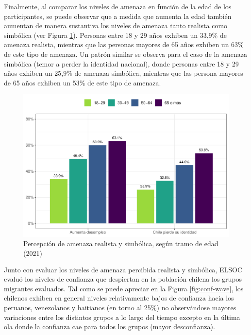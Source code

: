 \documentclass[
  12pt,
]{book}
\begin{document}
Finalmente, al comparar los niveles de amenaza en función de la edad de los participantes, se puede observar que a medida que aumenta la edad también aumentan de manera sustantiva los niveles de amenaza tanto realista como simbólica (ver Figura \ref{fig:amen-edad}). Personas entre 18 y 29 años exhiben un 33,9\% de amenaza realista, mientras que las personas mayores de 65 años exhiben un 63\% de este tipo de amenaza. Un patrón similar se observa para el caso de la amenaza simbólica (temor a perder la identidad nacional), donde personas entre 18 y 29 años exhiben un 25,9\% de amenaza simbólica, mientras que las persona mayores de 65 años exhiben un 53\% de este tipo de amenaza.

\begin{figure}

{\centering \includegraphics{reporte-elsoc_files/figure-latex/amen-edad-1} 

}

\caption{Percepción de amenaza realista y simbólica, según tramo de edad (2021)}\label{fig:amen-edad}
\end{figure}

Junto con evaluar los niveles de amenaza percibida realista y simbólica, ELSOC evaluó los niveles de confianza que despiertan en la población chilena los grupos migrantes evaluados. Tal como se puede apreciar en la Figura \ref{fig:conf-wave}, los chilenos exhiben en general niveles relativamente bajos de confianza hacia los peruanos, venezolanos y haitianos (en torno al 25\%) no observándose mayores variaciones entre los distintos grupos a lo largo del tiempo excepto en la última ola donde la confianza cae para todos los grupos (mayor desconfianza).
\end{document}
